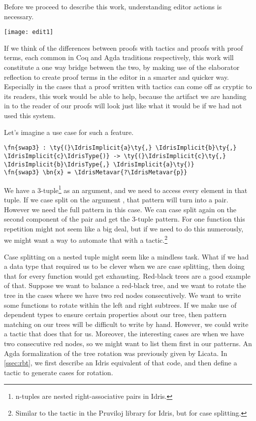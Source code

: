 
Before we proceed to describe this work, understanding editor actions is necessary.

\texttt{[image: edit1]}

If we think of the differences between proofs with tactics and proofs with
proof terms, each common in Coq and Agda traditions respectively,
this work will constitute a one way bridge between the two, by
making use of the elaborator reflection to create proof terms in the editor in
a smarter and quicker way. Especially in the cases that a proof written with
tactics can come off as cryptic to its readers, this work would be able to
help, because the artifact we are handing in to the reader of our proofs
will look just like what it would be if we had not used this system.

Let's imagine a use case for such a feature.
\begin{Verbatim}[framesep=2mm, label=\footnotesize{\normalfont{Idris}}, labelposition=topline]
\fn{swap3} : \ty{(}\IdrisImplicit{a}\ty{,} \IdrisImplicit{b}\ty{,} \IdrisImplicit{c}\IdrisType{)} -> \ty{(}\IdrisImplicit{c}\ty{,} \IdrisImplicit{b}\IdrisType{,} \IdrisImplicit{a}\ty{)}
\fn{swap3} \bn{x} = \IdrisMetavar{?\IdrisMetavar{p}}
\end{Verbatim}
We have a 3-tuple\footnote{n-tuples are nested right-associative pairs in
Idris.} as an argument, and we need to access every element in that tuple.
If we case split on the argument , that pattern will turn into
a pair. However we need the full  pattern in this
case. We can case split again on the second component of the pair and get the
3-tuple pattern.
For one function this repetition might not seem like a big deal, but if we need
to do this numerously, we might want a way to automate that with a
tactic.\footnote{Similar to the  tactic in the Pruviloj library
for Idris, but for case splitting.}

Case splitting on a nested tuple might seem like a mindless task. What if we
had a data type that required us to be clever when we are case splitting,
then doing that for every function would get exhausting.
Red-black trees\cite{okasakiRedBlack} are a good example of that.
Suppose we want to balance a red-black tree, and we want to rotate the tree in
the cases where we have two red nodes consecutively. We want to write some
functions to rotate within the left and right subtrees. If we make use of
dependent types to ensure certain properties about our tree, then pattern
matching on our trees will be difficult to write by hand. However, we could
write a tactic that does that for us. Moreover, the interesting cases are when
we have two consecutive red nodes, so we might want to list them first in our
patterns.  An Agda formalization of the tree rotation was previously given by
Licata\cite{licataOPLSS}. In \autoref{ssec:rbt}, we first describe an Idris
equivalent of that code, and then define a tactic to generate cases for
rotation.

